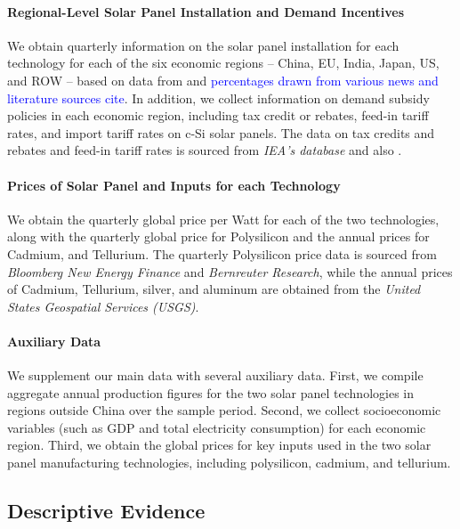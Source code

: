 \documentclass[12pt, letter]{article}
\begin{document}
\paragraph{Regional-Level Solar Panel Installation and Demand Incentives}
We obtain quarterly information on the solar panel installation for each technology for each of the six economic regions -- China, EU, India, Japan, US, and ROW -- based on data from \cite{OWID_solar_pv_capacity_2025} and \textcolor{blue}{percentages drawn from various news and literature sources cite}. In addition, we collect information on demand subsidy policies in each economic region, including tax credit or rebates, feed-in tariff rates, and import tariff rates on c-Si solar panels. The data on tax credits and rebates and feed-in tariff rates is sourced from \textit{IEA's database} and also \cite{gerarden2023demanding}.

\paragraph{Prices of Solar Panel and Inputs for each Technology}
We obtain the quarterly global price per Watt for each of the two technologies, along with the quarterly global price for Polysilicon and the annual prices for Cadmium, and Tellurium. The quarterly Polysilicon price data is sourced from \textit{Bloomberg New Energy Finance} and \textit{Bernreuter Research}, while the annual prices of Cadmium, Tellurium, silver, and aluminum are obtained from the \textit{United States Geospatial Services (USGS)}. 

\paragraph{Auxiliary Data}
We supplement our main data with several auxiliary data. First, we compile aggregate annual production figures for the two solar panel technologies in regions outside China over the sample period. Second, we collect socioeconomic variables (such as GDP and total electricity consumption) for each economic region. Third, we obtain the global prices for key inputs used in the two solar panel manufacturing technologies, including polysilicon, cadmium, and tellurium.


\subsection{Descriptive Evidence}
\label{subsec:inst_china_PV}
\end{document}
